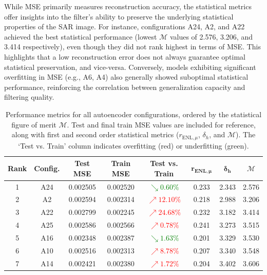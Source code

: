 While MSE primarily measures reconstruction accuracy, the statistical metrics offer insights into the filter's ability to preserve the underlying statistical properties of the SAR image. For instance, configurations A24, A2, and A22 achieved the best statistical performance (lowest $\mathcal{M}$ values of 2.576, 3.206, and 3.414 respectively), even though they did not rank highest in terms of MSE. This highlights that a low reconstruction error does not always guarantee optimal statistical preservation, and vice-versa. Conversely, models exhibiting significant overfitting in MSE (e.g., A6, A4) also generally showed suboptimal statistical performance, reinforcing the correlation between generalization capacity and filtering quality.

\begin{table}[!ht]
\centering
\caption{Performance metrics for all autoencoder configurations, ordered by the statistical figure of merit $\mathcal{M}$. Test and final train MSE values are included for reference, along with first and second order statistical metrics
($r_{\text{ENL},\mu}$, $\delta_h$, and $\mathcal{M}$). The `Test vs. Train' column indicates overfitting (red) or underfitting (green).}
\label{tab:mse_results}
\vspace{3mm}
\scriptsize
\renewcommand{\arraystretch}{1.15}
\begin{tabular}{|c|c|c|c|c|c|c|c|}
\hline
\textbf{Rank} & \textbf{Config.} & \textbf{Test MSE} & \textbf{Train MSE} & \textbf{Test vs. Train} & $\boldsymbol{r_{\text{ENL},\mu}}$ & $\boldsymbol{\delta_h}$ & $\boldsymbol{\mathcal{M}}$ \\
\hline
1  & A24 & 0.002505 & 0.002520 & \textcolor{green}{$\searrow 0.60\%$}  & 0.233 & 2.343 & 2.576 \\
2  & A2  & 0.002594 & 0.002314 & \textcolor{red}{$\nearrow 12.10\%$}   & 0.218 & 2.988 & 3.206 \\
3  & A22 & 0.002799 & 0.002245 & \textcolor{red}{$\nearrow 24.68\%$}   & 0.232 & 3.182 & 3.414 \\
4  & A25 & 0.002586 & 0.002566 & \textcolor{red}{$\nearrow 0.78\%$}    & 0.241 & 3.273 & 3.515 \\
5  & A16 & 0.002348 & 0.002387 & \textcolor{green}{$\searrow 1.63\%$}  & 0.201 & 3.329 & 3.530 \\
6  & A10 & 0.002516 & 0.002313 & \textcolor{red}{$\nearrow 8.78\%$}    & 0.207 & 3.340 & 3.548 \\
7  & A14 & 0.002421 & 0.002380 & \textcolor{red}{$\nearrow 1.72\%$}    & 0.204 & 3.402 & 3.606 \\

\end{tabular}
\end{table}
